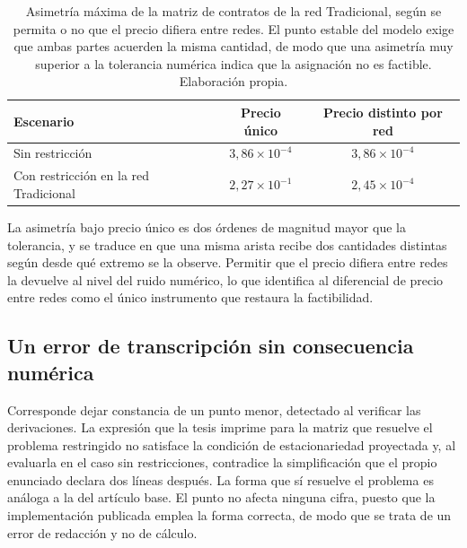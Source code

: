 \begin{table}[htbp]
    \centering
    \small
    \caption[Simetría de la red Tradicional bajo precio único]{Asimetría máxima
    de la matriz de contratos de la red Tradicional, según se permita o no que el
    precio difiera entre redes. El punto estable del modelo exige que ambas partes
    acuerden la misma cantidad, de modo que una asimetría muy superior a la
    tolerancia numérica indica que la asignación no es factible. Elaboración
    propia.}
    \label{tab:dual-simetria}
    \begin{tabular}{lcc}
        \toprule
        Escenario & Precio único & Precio distinto por red \\
        \midrule
        Sin restricción & $3{,}86\times10^{-4}$ & $3{,}86\times10^{-4}$ \\
        Con restricción en la red Tradicional & $2{,}27\times10^{-1}$ & $2{,}45\times10^{-4}$ \\
        \bottomrule
    \end{tabular}
\end{table}

La asimetría bajo precio único es dos órdenes de magnitud mayor que la tolerancia,
y se traduce en que una misma arista recibe dos cantidades distintas según desde
qué extremo se la observe. Permitir que el precio difiera entre redes la devuelve
al nivel del ruido numérico, lo que identifica al diferencial de precio entre
redes como el único instrumento que restaura la factibilidad.

\subsection{Un error de transcripción sin consecuencia numérica}
\label{anexo:dual-transcripcion}

Corresponde dejar constancia de un punto menor, detectado al verificar las
derivaciones. La expresión que la tesis imprime para la matriz que resuelve el
problema restringido no satisface la condición de estacionariedad proyectada y,
al evaluarla en el caso sin restricciones, contradice la simplificación que el
propio enunciado declara dos líneas después. La forma que sí resuelve el problema
es análoga a la del artículo base. El punto no afecta ninguna cifra, puesto que
la implementación publicada emplea la forma correcta, de modo que se trata de un
error de redacción y no de cálculo.
